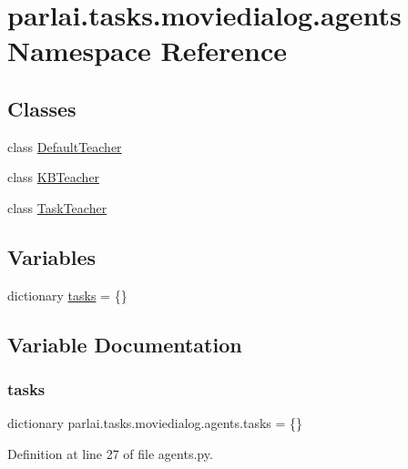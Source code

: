 \hypertarget{namespaceparlai_1_1tasks_1_1moviedialog_1_1agents}{}\section{parlai.\+tasks.\+moviedialog.\+agents Namespace Reference}
\label{namespaceparlai_1_1tasks_1_1moviedialog_1_1agents}
\subsection*{Classes}
\begin{DoxyCompactItemize}
\item 
class \hyperlink{classparlai_1_1tasks_1_1moviedialog_1_1agents_1_1DefaultTeacher}{Default\+Teacher}
\item 
class \hyperlink{classparlai_1_1tasks_1_1moviedialog_1_1agents_1_1KBTeacher}{K\+B\+Teacher}
\item 
class \hyperlink{classparlai_1_1tasks_1_1moviedialog_1_1agents_1_1TaskTeacher}{Task\+Teacher}
\end{DoxyCompactItemize}
\subsection*{Variables}
\begin{DoxyCompactItemize}
\item 
dictionary \hyperlink{namespaceparlai_1_1tasks_1_1moviedialog_1_1agents_a908154750e0a84d5ffc371450d2ee09c}{tasks} = \{\}
\end{DoxyCompactItemize}


\subsection{Variable Documentation}
\mbox{\label{namespaceparlai_1_1tasks_1_1moviedialog_1_1agents_a908154750e0a84d5ffc371450d2ee09c}} 
\subsubsection{\texorpdfstring{tasks}{tasks}}
{\footnotesize\ttfamily dictionary parlai.\+tasks.\+moviedialog.\+agents.\+tasks = \{\}}



Definition at line 27 of file agents.\+py.

